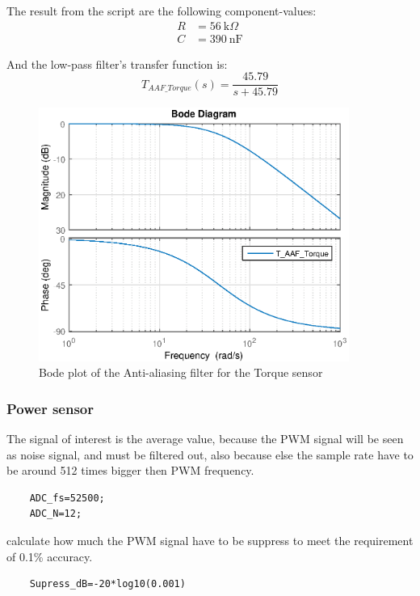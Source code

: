 The result from the script are the following component-values:	
\begin{equation}
	\begin{split}
	R &= \SI{56}{\kilo\Omega}\\
	C &= \SI{390}{\nano\F}
	\end{split}
\end{equation}
	
And the low-pass filter's transfer function is:
\begin{equation}
	T_{{AAF\_Torque}}(s) = \frac{45.79}{s+ 45.79}
\end{equation}
	
	
\begin{figure}[H]
	\centering
	\includegraphics [width=4in]{Hardware/Pictures/FilterAnalyse_01.eps}
	\caption{Bode plot of the Anti-aliasing filter for the Torque sensor}
	\label{fig:BODE_AAF_Torque}
\end{figure}
	
	
\subsubsection*{Power sensor}
The signal of interest is the average value, because the PWM signal will be seen as noise signal, and must be filtered out, also because else the sample rate have to be around 512 times bigger then PWM frequency.
	
\begin{lstlisting}
	ADC_fs=52500;
	ADC_N=12;
\end{lstlisting}
	
calculate how much the PWM signal have to be suppress to meet the requirement of 0.1\% accuracy.
	
\begin{lstlisting}
	Supress_dB=-20*log10(0.001)
\end{lstlisting}

